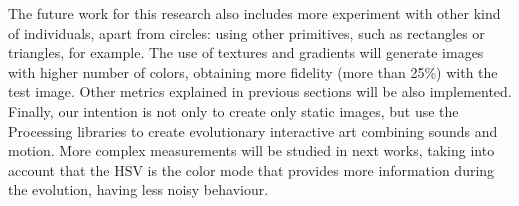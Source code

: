 The future work for this research also includes more experiment with other kind of individuals, apart from circles: using other primitives, such as rectangles or triangles, for example. The use of textures and gradients will generate images with higher number of colors, obtaining more fidelity (more than 25\%) with the test image. Other metrics explained in previous sections will be also implemented. Finally, our intention is not only to create only static images, but use the Processing libraries to create evolutionary interactive art combining sounds and motion. %
More complex measurements will be studied in next works, taking into account that the HSV is the color mode that provides more information during the evolution, having less noisy behaviour.